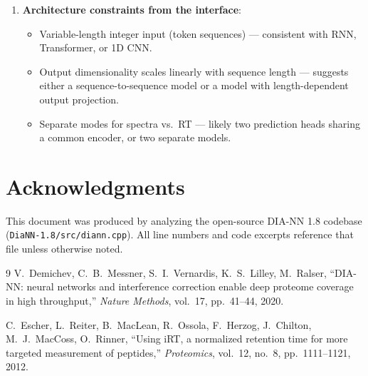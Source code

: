 \documentclass[11pt,a4paper]{article}
\begin{document}
\begin{enumerate}
    \item \textbf{Architecture constraints from the interface}:
    \begin{itemize}
        \item Variable-length integer input (token sequences) --- consistent with RNN, Transformer, or 1D CNN.
        \item Output dimensionality scales linearly with sequence length --- suggests either a sequence-to-sequence model or a model with length-dependent output projection.
        \item Separate modes for spectra vs.\ RT --- likely two prediction heads sharing a common encoder, or two separate models.
    \end{itemize}
\end{enumerate}

\section*{Acknowledgments}

This document was produced by analyzing the open-source DIA-NN 1.8 codebase (\texttt{DiaNN-1.8/src/diann.cpp}). All line numbers and code excerpts reference that file unless otherwise noted.

\begin{thebibliography}{9}
V.~Demichev, C.~B.~Messner, S.~I.~Vernardis, K.~S.~Lilley, M.~Ralser,
``DIA-NN: neural networks and interference correction enable deep proteome coverage in high throughput,''
\emph{Nature Methods}, vol.~17, pp.~41--44, 2020.

C.~Escher, L.~Reiter, B.~MacLean, R.~Ossola, F.~Herzog, J.~Chilton, M.~J.~MacCoss, O.~Rinner,
``Using iRT, a normalized retention time for more targeted measurement of peptides,''
\emph{Proteomics}, vol.~12, no.~8, pp.~1111--1121, 2012.
\end{thebibliography}
\end{document}

